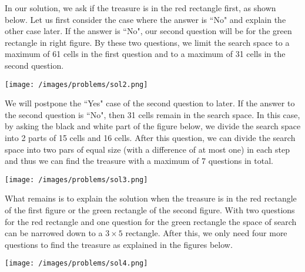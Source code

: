 \begin{solution}
In our solution, we ask if the treasure is in the  red rectangle first, as shown below. Let us first consider the case where the answer is ``No" and explain the other case later. If the answer is ``No", our second question will be for the green rectangle in right figure. By these two questions, we limit the search space to a maximum of 61 cells in the first question and to a maximum of 31 cells in the second question. 

\begin{center}
	\texttt{[image: /images/problems/sol2.png]}
\end{center}


 We will postpone the ``Yes" case of the second question to later. If the answer to the second question is ``No", then 31 cells remain in the search space. In this case, by asking the black and white part of the figure below, we divide the search space into 2 parts of 15 cells and 16 cells.  After this question, we can divide the search space into two pars of equal size (with a difference of at most one) in each step and thus we can find the treasure with a maximum of 7 questions in total.

\begin{center}
	\texttt{[image: /images/problems/sol3.png]}
\end{center}

 
 What remains is to explain the solution when the treasure is in the red rectangle of the first figure or the green rectangle of the second figure. With two questions for the red rectangle and one question for the green rectangle the space of search can be narrowed down to a  $3 \times 5$ rectangle. After this, we only need four more questions to find the treasure as explained in the figures below. 
 
\begin{center}
	\texttt{[image: /images/problems/sol4.png]}
\end{center}


\end{solution}
